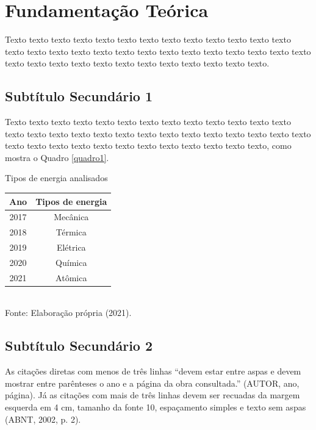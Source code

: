 \chapter{Fundamentação Teórica}

Texto texto texto texto texto texto texto texto texto texto texto texto texto texto texto texto texto texto texto texto texto texto texto texto texto texto texto texto texto texto texto texto texto texto texto texto texto texto texto.

\section{Subtítulo Secundário 1}

Texto texto texto texto texto texto texto texto texto texto texto texto texto texto texto texto texto texto texto texto texto texto texto texto texto texto texto texto texto texto texto texto texto texto texto texto texto texto texto, como mostra o Quadro \ref{quadro1}.


\begin{quadro}[h]
\centering

\caption{Tipos de energia analisados}
\begin{tabular}{|c|c|}
\hline
\textbf{Ano} & \textbf{Tipos de energia} \\ \hline
2017         & Mecânica                  \\ \hline
2018         & Térmica                   \\ \hline
2019         & Elétrica                  \\ \hline
2020         & Química                   \\ \hline
2021         & Atômica                   \\ \hline
\end{tabular}
\label{quadro1}
\\
\small{Fonte: Elaboração própria (2021).} 
\end{quadro}

\section{Subtítulo Secundário 2}

As citações diretas com menos de três linhas “devem estar entre aspas e devem mostrar entre parênteses o ano e a página da obra consultada.” (AUTOR, ano, página). Já as citações com mais de três linhas devem ser recuadas da margem esquerda em 4 cm, tamanho da fonte 10, espaçamento simples e texto sem aspas (ABNT, 2002, p. 2).



